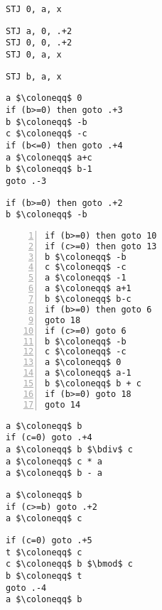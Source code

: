 \documentclass[a4paper,11pt]{article}             %
\makeatletter
\newcommand*{\bdiv}{%
  \nonscript\mskip-\medmuskip\mkern5mu%
  \mathbin{\operator@font div}\penalty900\mkern5mu%
  \nonscript\mskip-\medmuskip
}
\makeatother
\begin{document}
\begin{ex}
\begin{exlist}
\begin{multicols}{2}
\begin{exlist}
  \item
    \begin{lstlisting}
STJ 0, a, x
    \end{lstlisting}
    
  \item
    \begin{lstlisting}
STJ a, 0, .+2
STJ 0, 0, .+2
STJ 0, a, x
    \end{lstlisting}
    
  \item
    \begin{lstlisting}
STJ b, a, x
    \end{lstlisting}
  \end{exlist}
  \end{multicols}

  \item
    \begin{multicols}{2}
    \begin{exlist}
    \item  
    \begin{lstlisting}[mathescape=true]
a $\coloneqq$ 0
if (b>=0) then goto .+3
b $\coloneqq$ -b
c $\coloneqq$ -c
if (b<=0) then goto .+4
a $\coloneqq$ a+c
b $\coloneqq$ b-1
goto .-3
    \end{lstlisting}
    
  \item
    \begin{lstlisting}[mathescape=true]
if (b>=0) then goto .+2
b $\coloneqq$ -b
    \end{lstlisting}

  \item \leavevmode
    \begin{lstlisting}[mathescape=true, numbers=left]
if (b>=0) then goto 10
if (c>=0) then goto 13
b $\coloneqq$ -b
c $\coloneqq$ -c
a $\coloneqq$ -1
a $\coloneqq$ a+1
b $\coloneqq$ b-c
if (b>=0) then goto 6
goto 18
if (c>=0) goto 6
b $\coloneqq$ -b
c $\coloneqq$ -c
a $\coloneqq$ 0
a $\coloneqq$ a-1
b $\coloneqq$ b + c
if (b>=0) goto 18
goto 14
    \end{lstlisting}
    
  \item 
    \begin{lstlisting}[mathescape=true]
a $\coloneqq$ b
if (c=0) goto .+4
a $\coloneqq$ b $\bdiv$ c
a $\coloneqq$ c * a
a $\coloneqq$ b - a
    \end{lstlisting}

  \item 
    \begin{lstlisting}[mathescape=true]
a $\coloneqq$ b
if (c>=b) goto .+2
a $\coloneqq$ c
    \end{lstlisting}

  \item 
    \begin{lstlisting}[mathescape=true]
if (c=0) goto .+5
t $\coloneqq$ c
c $\coloneqq$ b $\bmod$ c
b $\coloneqq$ t
goto .-4
a $\coloneqq$ b
    \end{lstlisting}
    \end{exlist}
    \end{multicols}
  \end{exlist}
\end{ex}
\end{document}
